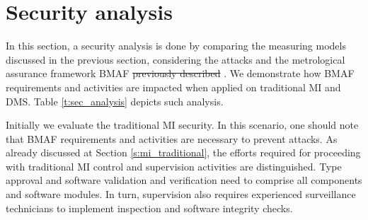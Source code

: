 \documentclass[journal]{IEEEtran}
\providecommand{\DIFadd}[1]{{\protect\color{blue}\uwave{#1}}} %
\providecommand{\DIFdel}[1]{{\protect\color{red}\sout{#1}}}                      %
\providecommand{\DIFaddbegin}{} %
\providecommand{\DIFaddend}{} %
\providecommand{\DIFdelbegin}{} %
\providecommand{\DIFdelend}{} %
\begin{document}

\section{Security analysis}
\label{s:sec_analysis}
In this section, a security analysis is done by comparing the measuring models discussed in the previous section, considering the attacks and the metrological assurance framework BMAF \DIFdelbegin \DIFdel{previously described }\DIFdelend \DIFaddbegin \DIFadd{described previously}\DIFaddend . 
We demonstrate how BMAF requirements and activities are impacted when applied on traditional MI and DMS. 
Table \ref{t:sec_analysis} depicts such analysis.

Initially we evaluate the traditional MI security. In this scenario, one should note that BMAF requirements and activities are  necessary to prevent attacks. As already discussed at Section \ref{s:mi_traditional}, the efforts required for proceeding with traditional MI control and supervision activities are distinguished. Type approval and software validation and verification need to comprise all components and software modules. In turn, supervision also requires experienced surveillance technicians to implement inspection and software integrity checks.
\end{document}
